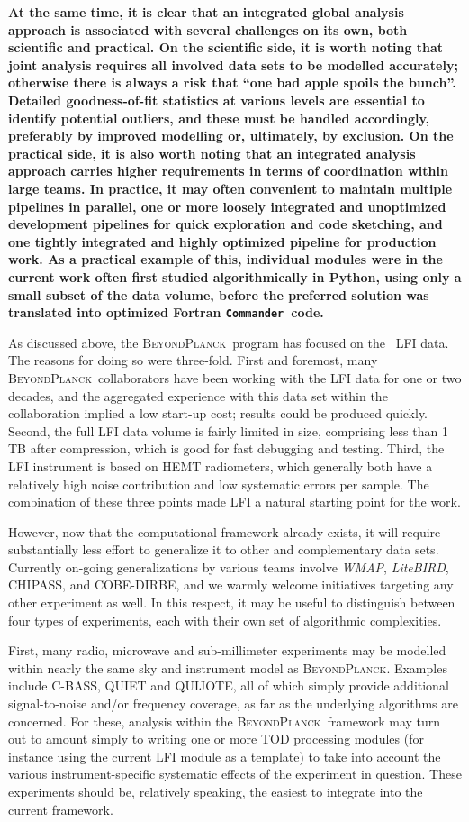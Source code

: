 \documentclass[twocolumn]{aa}
\def\WMAP{\emph{WMAP}}
\def\commander{\texttt{Commander}}
\newcommand{\BP}{\textsc{BeyondPlanck}}
\begin{document}
{\bf At the same time, it is clear that an integrated global analysis approach is associated with several challenges on its own, both scientific and practical. On the scientific side, it is worth noting that joint analysis requires all involved data sets to be modelled accurately; otherwise there is always a risk that ``one bad apple spoils the bunch''. Detailed goodness-of-fit statistics at various levels are essential to identify potential outliers, and these must be handled accordingly, preferably by improved modelling or, ultimately, by exclusion. On the practical side, it is also worth noting that an integrated analysis approach carries higher requirements in terms of coordination within large teams. In practice, it may often convenient to maintain multiple pipelines in parallel, one or more loosely integrated and unoptimized development pipelines for quick exploration and code sketching, and one tightly integrated and highly optimized pipeline for production work. As a practical example of this, individual modules were in the current work often first studied algorithmically in Python, using only a small subset of the data volume, before the preferred solution was translated into optimized Fortran \commander\ code.
}

As discussed above, the \BP\ program has focused on the \Planck\ LFI
data. The reasons for doing so were three-fold. First and foremost,
many \BP\ collaborators have been working with the LFI data for one or
two decades, and the aggregated experience with this data set within
the collaboration implied a low start-up cost; results could be
produced quickly. Second, the full LFI data volume is fairly limited
in size, comprising less than 1\,TB after compression, which is good
for fast debugging and testing. Third, the LFI instrument is based on
HEMT radiometers, which generally both have a relatively high noise
contribution and low systematic errors per sample. The combination of
these three points made LFI a natural starting point for the work.

However, now that the computational framework already exists, it will
require substantially less effort to generalize it to other and
complementary data sets. Currently on-going generalizations by various
teams involve \WMAP, \emph{LiteBIRD}, CHIPASS, and COBE-DIRBE, and we
warmly welcome initiatives targeting any other experiment as well. In
this respect, it may be useful to distinguish between four types of
experiments, each with their own set of algorithmic complexities.

First, many radio, microwave and sub-millimeter experiments may be
modelled within nearly the same sky and instrument model as
\BP. Examples include C-BASS, QUIET and QUIJOTE, all of which simply
provide additional signal-to-noise and/or frequency coverage, as far
as the underlying algorithms are concerned. For these, analysis within
the \BP\ framework may turn out to amount simply to writing one or
more TOD processing modules (for instance using the current LFI module
as a template) to take into account the various instrument-specific
systematic effects of the experiment in question. These experiments
should be, relatively speaking, the easiest to integrate into the
current framework.
\end{document}
